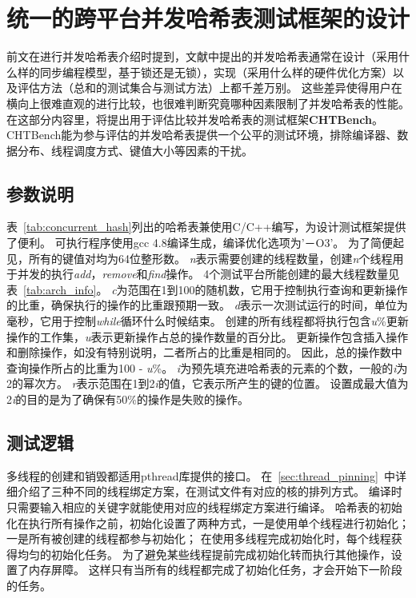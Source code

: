 \section{统一的跨平台并发哈希表测试框架的设计}
\label{sec:design_framework}

前文在进行并发哈希表介绍时提到，文献中提出的并发哈希表通常在设计（采用什么样的同步编程模型，基于锁还是无锁），实现（采用什么样的硬件优化方案）以及评估方法（总和的测试集合与测试方法）上都千差万别。
这些差异使得用户在横向上很难直观的进行比较，也很难判断究竟哪种因素限制了并发哈希表的性能。
在这部分内容里，将提出用于评估比较并发哈希表的测试框架\textbf{CHTBench}。
CHTBench能为参与评估的并发哈希表提供一个公平的测试环境，排除编译器、数据分布、线程调度方式、键值大小等因素的干扰。

\subsection{参数说明}
表~\ref{tab:concurrent_hash}列出的哈希表兼使用C/C++编写，为设计测试框架提供了便利。
可执行程序使用gcc 4.8编译生成，编译优化选项为'－O3'。
为了简便起见，所有的键值对均为64位整形数。
\textit{n}表示需要创建的线程数量，创建\textit{n}个线程用于并发的执行\textit{add}，\textit{remove}和\textit{find}操作。
4个测试平台所能创建的最大线程数量见表~\ref{tab:arch_info}。
\textit{c}为范围在1到100的随机数，它用于控制执行查询和更新操作的比重，确保执行的操作的比重跟预期一致。
\textit{d}表示一次测试运行的时间，单位为毫秒，它用于控制\textit{while}循环什么时候结束。
创建的所有线程都将执行包含\textit{u}\%更新操作的工作集，\textit{u}表示更新操作占总的操作数量的百分比。
更新操作包含插入操作和删除操作，如没有特别说明，二者所占的比重是相同的。
因此，总的操作数中查询操作所占的比重为100 - \textit{u}\%。
\textit{i}为预先填充进哈希表的元素的个数，一般的\textit{i}为2的幂次方。
\textit{r}表示范围在1到2\textit{i}的值，它表示所产生的键的位置。
设置成最大值为2\textit{i}的目的是为了确保有50\%的操作是失败的操作。

\subsection{测试逻辑}
\label{sec:para_config}
多线程的创建和销毁都适用pthread库提供的接口。
在~\ref{sec:thread_pinning}~中详细介绍了三种不同的线程绑定方案，在测试文件有对应的核的排列方式。
编译时只需要输入相应的关键字就能使用对应的线程绑定方案进行编译。
哈希表的初始化在执行所有操作之前，初始化设置了两种方式，一是使用单个线程进行初始化；一是所有被创建的线程都参与初始化；
在使用多线程完成初始化时，每个线程获得均匀的初始化任务。
为了避免某些线程提前完成初始化转而执行其他操作，设置了内存屏障。
这样只有当所有的线程都完成了初始化任务，才会开始下一阶段的任务。

